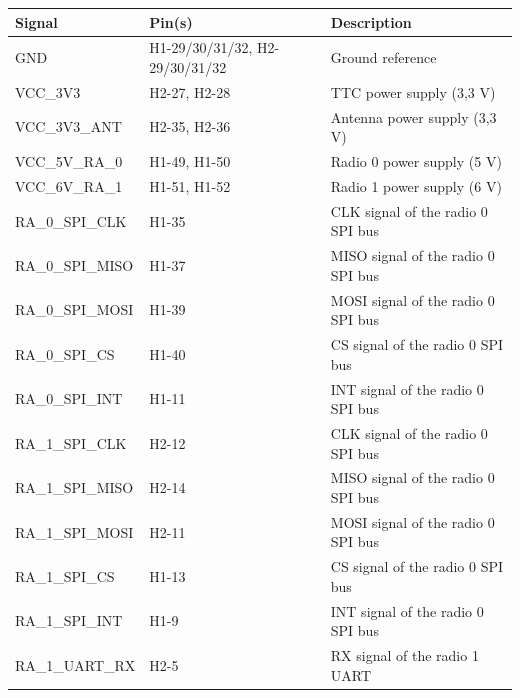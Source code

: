 \begin{table}[!ht]
    \centering
    \begin{tabular}{lL{0.3\textwidth}l}
        \toprule[1.5pt]
        \textbf{Signal}  & \textbf{Pin(s)}                  & \textbf{Description} \\
        \midrule
        GND              & H1-29/30/31/32, H2-29/30/31/32   & Ground reference                      \\
        VCC\_3V3         & H2-27, H2-28                     & TTC power supply (3,3 V)              \\
        VCC\_3V3\_ANT    & H2-35, H2-36                     & Antenna power supply (3,3 V)          \\
        VCC\_5V\_RA\_0   & H1-49, H1-50                     & Radio 0 power supply (5 V)            \\
        VCC\_6V\_RA\_1   & H1-51, H1-52                     & Radio 1 power supply (6 V)            \\
        RA\_0\_SPI\_CLK  & H1-35                            & CLK signal of the radio 0 SPI bus     \\
        RA\_0\_SPI\_MISO & H1-37                            & MISO signal of the radio 0 SPI bus    \\
        RA\_0\_SPI\_MOSI & H1-39                            & MOSI signal of the radio 0 SPI bus    \\
        RA\_0\_SPI\_CS   & H1-40                            & CS signal of the radio 0 SPI bus      \\
        RA\_0\_SPI\_INT  & H1-11                            & INT signal of the radio 0 SPI bus     \\
        RA\_1\_SPI\_CLK  & H2-12                            & CLK signal of the radio 0 SPI bus     \\
        RA\_1\_SPI\_MISO & H2-14                            & MISO signal of the radio 0 SPI bus    \\
        RA\_1\_SPI\_MOSI & H2-11                            & MOSI signal of the radio 0 SPI bus    \\
        RA\_1\_SPI\_CS   & H1-13                            & CS signal of the radio 0 SPI bus      \\
        RA\_1\_SPI\_INT  & H1-9                             & INT signal of the radio 0 SPI bus     \\
        RA\_1\_UART\_RX  & H2-5                             & RX signal of the radio 1 UART         \\

\end{tabular}
\end{table}
